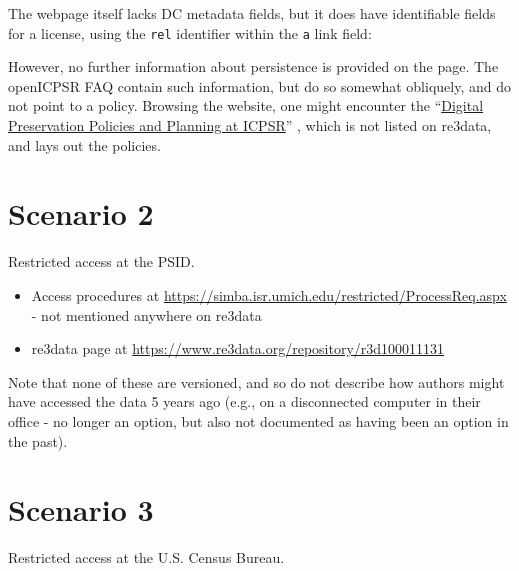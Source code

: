 \documentclass[10pt,letterpaper]{article}
\begin{document}
The webpage itself lacks \ac{DC} metadata fields, but it does have identifiable fields for a license, using the \texttt{rel} identifier within the \lstinline|a| link field:


However, no further information about persistence is provided on the page. The openICPSR FAQ contain such information, but do so somewhat obliquely, and do not point to a policy. Browsing the website, one might encounter the ``\href{https://www.icpsr.umich.edu/icpsrweb/content/datamanagement/preservation/policies/index.html}{Digital Preservation Policies and Planning at ICPSR}'' \parencite{icpsr-preservation}, which is not listed on re3data, and lays out the policies. 

\section{Scenario 2}
Restricted access at the \ac{PSID}. 
\begin{itemize}
	\item Access procedures at \url{https://simba.isr.umich.edu/restricted/ProcessReq.aspx}  - not mentioned anywhere on re3data
	\item re3data page at \url{https://www.re3data.org/repository/r3d100011131}
\end{itemize}
Note that none of these are versioned, and so do not describe how authors might have accessed the data 5 years ago (e.g., on a disconnected computer in their office - no longer an option, but also not documented as having been an option in the past).

\section{Scenario 3}
Restricted access at the U.S. Census Bureau.

%
%
\end{document}
